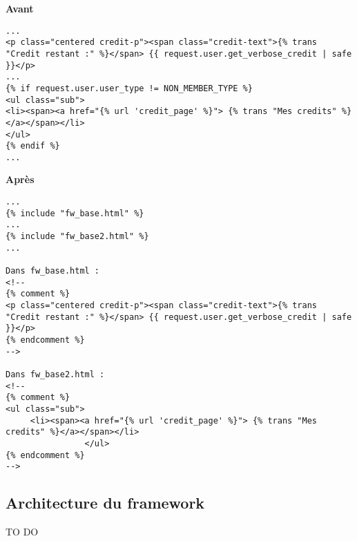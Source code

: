 \begin{minipage}{.5\textwidth}
\begin{center} \textbf{Avant}\end{center}
\begin{lstlisting}
...
<p class="centered credit-p"><span class="credit-text">{% trans "Credit restant :" %}</span> {{ request.user.get_verbose_credit | safe }}</p>
...
{% if request.user.user_type != NON_MEMBER_TYPE %}
<ul class="sub">
<li><span><a href="{% url 'credit_page' %}"> {% trans "Mes credits" %}</a></span></li>
</ul>
{% endif %}
...
\end{lstlisting} 
\end{minipage}
\hspace{0.3cm}
\begin{minipage}{.5\textwidth}
\begin{center} \textbf{Après}\end{center}
\begin{lstlisting}
...
{% include "fw_base.html" %}
...
{% include "fw_base2.html" %}
...

Dans fw_base.html : 
<!--
{% comment %}
<p class="centered credit-p"><span class="credit-text">{% trans "Credit restant :" %}</span> {{ request.user.get_verbose_credit | safe }}</p>
{% endcomment %}
-->

Dans fw_base2.html : 
<!--
{% comment %}
<ul class="sub">
     <li><span><a href="{% url 'credit_page' %}"> {% trans "Mes credits" %}</a></span></li>
                </ul>
{% endcomment %}
-->
\end{lstlisting} 
\end{minipage}




\subsection{Architecture du framework}

TO DO


